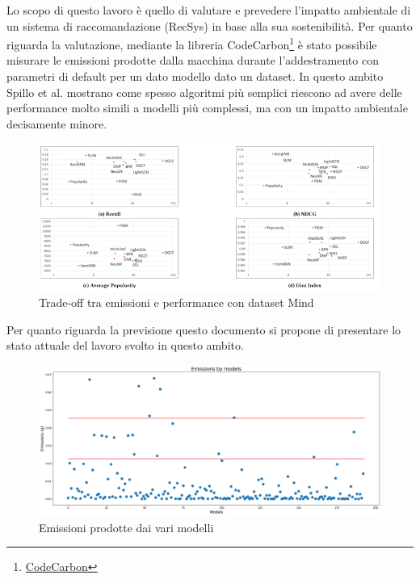 \noindent Lo scopo di questo lavoro è quello di valutare e prevedere l'impatto ambientale di un sistema di raccomandazione (RecSys) in base alla sua sostenibilità. Per quanto riguarda la valutazione, mediante la libreria CodeCarbon\footnote{\href{http://codecarbon.io}{CodeCarbon}}{} è stato possibile misurare le emissioni prodotte dalla macchina durante l'addestramento con parametri di default per un dato modello dato un dataset. 
In questo ambito  Spillo et al.\cite{spillo2023towards} mostrano come spesso algoritmi più semplici riescono ad avere delle performance molto simili a modelli più complessi, ma con un impatto ambientale decisamente minore.
\begin{figure}[H]
    \centering
    \includegraphics[scale=0.75]{images/risultati-valutazione.png}
    \caption*{Trade-off tra emissioni e performance con dataset Mind}


\end{figure}
\noindent Per quanto riguarda la previsione questo documento si propone di presentare lo stato attuale del lavoro svolto in questo ambito.
\begin{figure}[H]
    \centering
    \includegraphics[scale=0.25]{images/situazione-attuale.png}
    \caption*{Emissioni prodotte dai vari modelli}
\end{figure}

